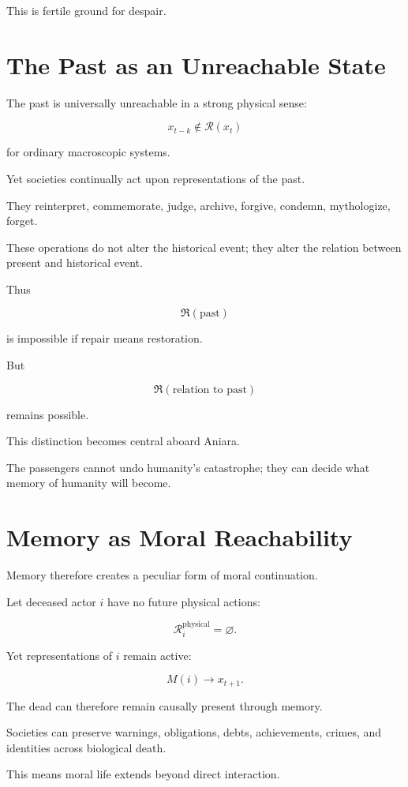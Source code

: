 \documentclass[11pt,oneside]{book}
\theoremstyle{definition}
\theoremstyle{remark}
\newcommand{\R}{\mathcal{R}}
\newcommand{\Repair}{\mathfrak{R}}
\begin{document}
This is fertile ground for despair.

\section{The Past as an Unreachable State}

The past is universally unreachable in a strong physical sense:

\[
x_{t-k}\notin\R(x_t)
\]

for ordinary macroscopic systems.

Yet societies continually act upon representations of the past.

They reinterpret, commemorate, judge, archive, forgive, condemn, mythologize, forget.

These operations do not alter the historical event; they alter the relation between present and historical event.

Thus

\[
\Repair(\text{past})
\]

is impossible if repair means restoration.

But

\[
\Repair(\text{relation to past})
\]

remains possible.

This distinction becomes central aboard Aniara.

The passengers cannot undo humanity's catastrophe; they can decide what memory of humanity will become.

\section{Memory as Moral Reachability}

Memory therefore creates a peculiar form of moral continuation.

Let deceased actor \(i\) have no future physical actions:

\[
\R_i^{\mathrm{physical}}=\varnothing.
\]

Yet representations of \(i\) remain active:

\[
M(i)\rightarrow x_{t+1}.
\]

The dead can therefore remain causally present through memory.

Societies can preserve warnings, obligations, debts, achievements, crimes, and identities across biological death.

This means moral life extends beyond direct interaction.
\end{document}
